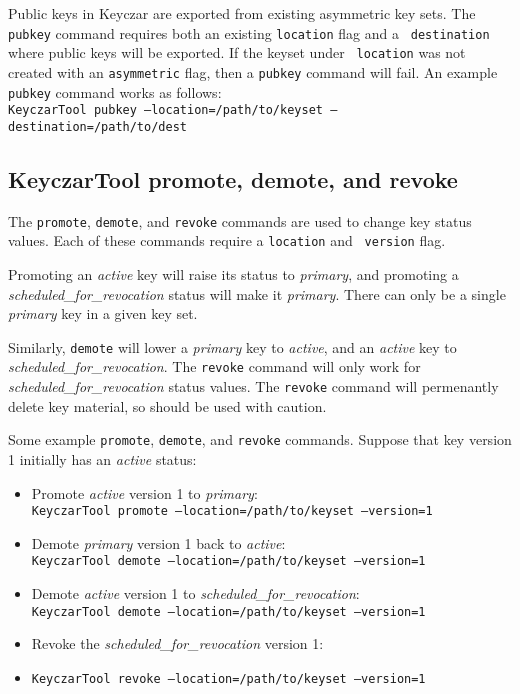 \documentclass{llncs}
\begin{document}
Public keys in Keyczar are exported from existing asymmetric key sets. The
{\tt pubkey} command requires both an existing {\tt location} flag and a {\tt
destination} where public keys will be exported. If the keyset under {\tt
location} was not created with an {\tt asymmetric} flag, then a {\tt pubkey}
command will fail. An example {\tt pubkey} command works as follows: \\
{\tt KeyczarTool pubkey --location=/path/to/keyset --destination=/path/to/dest}

\subsection{KeyczarTool promote, demote, and revoke}

The {\tt promote}, {\tt demote}, and {\tt revoke} commands are used to change
key status values. Each of these commands require a {\tt location} and {\tt
version} flag. 

Promoting an {\it active} key will raise its status to
{\it primary}, and promoting a {\it scheduled\_for\_revocation} status will make
it {\it primary}. There can only be a single {\it primary} key in a given key
set. 

Similarly, {\tt demote} will lower a {\it primary} key to {\it active},
and an {\it active} key to {\it scheduled\_for\_revocation}. The {\tt revoke}
command will only work for {\it scheduled\_for\_revocation} status values.
The {\tt revoke} command will permenantly delete key material, so should be
used with caution.

Some example {\tt promote}, {\tt demote}, and {\tt revoke} commands. Suppose
that key version 1 initially has an {\it active} status:
\begin{itemize}
\item Promote {\it active} version 1 to {\it primary}: \\
{\tt KeyczarTool promote --location=/path/to/keyset --version=1}
\item Demote {\it primary} version 1 back to {\it active}: \\
{\tt KeyczarTool demote --location=/path/to/keyset --version=1}
\item Demote {\it active} version 1 to {\it scheduled\_for\_revocation}: \\
{\tt KeyczarTool demote --location=/path/to/keyset --version=1}
\item Revoke the {\it scheduled\_for\_revocation} version 1:  
\item {\tt KeyczarTool revoke --location=/path/to/keyset --version=1}
\end{itemize}
\end{document}
